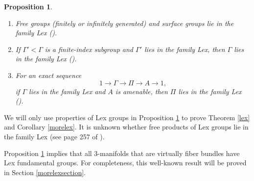 \documentclass{amsart}
\numberwithin{equation}{section}
\newtheorem{proposition}[theorem]{Proposition}
\theoremstyle{definition}
\begin{document}
\begin{proposition}\label{lexproperty}
\begin{enumerate}
\item Free groups (finitely or infinitely generated) and surface groups lie in the family Lex (\cite[Remark 7 and Proposition 3.8]{Bou}).
\item If $\Gamma'<\Gamma$ is a finite-index subgroup and $\Gamma'$ lies in the family Lex, then $\Gamma$ lies in the family Lex (\cite[Theorem 3.6]{Bou}).
\item For an exact sequence $$1\to \Gamma \to \Pi \to A\to 1,$$ if $\Gamma$ lies in the family Lex and $A$ is amenable, then $\Pi$ lies in the family Lex  (\cite[Theorem 3.2]{Bou}).
\end{enumerate}
\end{proposition}

We will only use properties of Lex groups in Proposition \ref{lexproperty} to prove Theorem \ref{lex} and Corollary \ref{morelex}. It is unknown whether free products of Lex groups lie in the family Lex (see page 257 of \cite{Bou}).

Proposition \ref{lexproperty} implies that all $3$-manifolds that are virtually fiber bundles have Lex fundamental groups. For completeness, this well-known result will be proved in Section \ref{morelexsection}.



\end{document}
